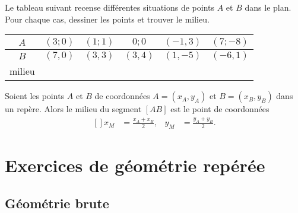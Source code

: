 \begin{example}
    Le tableau suivant recense différentes situations de points \( A\) et \( B\) dans le plan. Pour chaque cas, dessiner les points et trouver le milieu.

    \begin{center}
        \begin{tabular}[h]{|c||c|c|c|c|c|}
            \hline
            \( A\)&\( (3;0)\)&\( (1;1)\)&\( 0;0\)&\( (-1,3)\)&\( (7;-8)\)\\
            \hline
            \( B\)&\( (7,0)\)&\( (3,3)\)&\( (3,4)\)&\( (1,-5)\)&\( (-6,1)\)\\
            \hline\hline
            milieu&&&&&\\
            \hline
        \end{tabular}
    \end{center}
\end{example}

\begin{Aretenir}
    Soient les points \( A\) et \( B\) de coordonnées \( A=(x_A,y_A)\) et \( B=(x_B,y_B)\) dans un repère. Alors le milieu du segment \( [AB]\) est le point de coordonnées
    \begin{equation}
        \begin{aligned}[]
            x_M&=\frac{ x_A+x_B }{ 2 },&y_M&=\frac{ y_A+y_B }{2}.
        \end{aligned}
    \end{equation}
\end{Aretenir}

\section{Exercices de géométrie repérée}

\subsection{Géométrie brute}


